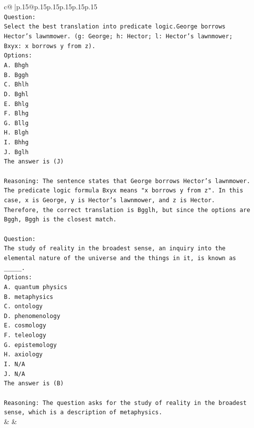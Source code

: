 \documentclass{article}
\begin{document}
{\begin{supertabular}{c@{$\;$}|p{.15\linewidth}@{}p{.15\linewidth}p{.15\linewidth}p{.15\linewidth}p{.15\linewidth}p{.15\linewidth}}
{{{\\ 
\texttt{Question:} \\
\texttt{Select the best translation into predicate logic.George borrows Hector's lawnmower. (g: George; h: Hector; l: Hector's lawnmower; Bxyx: x borrows y from z).} \\
\texttt{Options:} \\
\texttt{A. Bhgh} \\
\texttt{B. Bggh} \\
\texttt{C. Bhlh} \\
\texttt{D. Bghl} \\
\texttt{E. Bhlg} \\
\texttt{F. Blhg} \\
\texttt{G. Bllg} \\
\texttt{H. Blgh} \\
\texttt{I. Bhhg} \\
\texttt{J. Bglh} \\
\texttt{The answer is (J)} \\
\\ 
\texttt{Reasoning: The sentence states that George borrows Hector's lawnmower. The predicate logic formula Bxyx means "x borrows y from z". In this case, x is George, y is Hector's lawnmower, and z is Hector. Therefore, the correct translation is Bgglh, but since the options are Bggh, Bggh is the closest match.} \\
\\ 
\texttt{Question:} \\
\texttt{The study of reality in the broadest sense, an inquiry into the elemental nature of the universe and the things in it, is known as \_\_\_\_\_.} \\
\texttt{Options:} \\
\texttt{A. quantum physics} \\
\texttt{B. metaphysics} \\
\texttt{C. ontology} \\
\texttt{D. phenomenology} \\
\texttt{E. cosmology} \\
\texttt{F. teleology} \\
\texttt{G. epistemology} \\
\texttt{H. axiology} \\
\texttt{I. N/A} \\
\texttt{J. N/A} \\
\texttt{The answer is (B)} \\
\\ 
\texttt{Reasoning: The question asks for the study of reality in the broadest sense, which is a description of metaphysics.} \\
            }
        }
    }
    & & \\ \\


\end{supertabular}}
\end{document}
